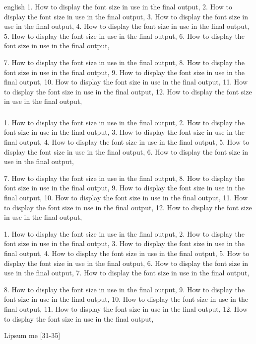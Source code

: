 \begin{otherlanguage*}{english}
    1. How to display the font size in use in the final output,
    2. How to display the font size in use in the final output,
    3. How to display the font size in use in the final output,
    4. How to display the font size in use in the final output,
    5. How to display the font size in use in the final output,
    6. How to display the font size in use in the final output,

    7. How to display the font size in use in the final output,
    8. How to display the font size in use in the final output,
    9. How to display the font size in use in the final output,
    10. How to display the font size in use in the final output,
    11. How to display the font size in use in the final output,
    12. How to display the font size in use in the final output,

    \subsubsection{\showfont}

    1. How to display the font size in use in the final output,
    2. How to display the font size in use in the final output,
    3. How to display the font size in use in the final output,
    4. How to display the font size in use in the final output,
    5. How to display the font size in use in the final output,
    6. How to display the font size in use in the final output,

    7. How to display the font size in use in the final output,
    8. How to display the font size in use in the final output,
    9. How to display the font size in use in the final output,
    10. How to display the font size in use in the final output,
    11. How to display the font size in use in the final output,
    12. How to display the font size in use in the final output,

    \subsubsubsection{\showfont}

    1. How to display the font size in use in the final output,
    2. How to display the font size in use in the final output,
    3. How to display the font size in use in the final output,
    4. How to display the font size in use in the final output,
    5. How to display the font size in use in the final output,
    6. How to display the font size in use in the final output,
    7. How to display the font size in use in the final output,

    8. How to display the font size in use in the final output,
    9. How to display the font size in use in the final output,
    10. How to display the font size in use in the final output,
    11. How to display the font size in use in the final output,
    12. How to display the font size in use in the final output,


    Lipsum me [31-35]

\end{otherlanguage*}


